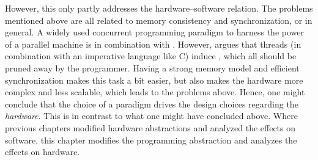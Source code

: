 However, this only partly addresses the hardware--software relation.
The problems mentioned above are all related to memory consistency and synchronization, or  in general.
A widely used concurrent programming paradigm to harness the power of a parallel machine is  in combination with .
However, \citet{lee:problem_with_threads} argues that threads (in combination with an imperative language like C) induce , which all should be pruned away by the programmer.
Having a strong memory model and efficient synchronization makes this task a bit easier, but also makes the hardware more complex and less scalable, which leads to the problems above.
Hence, one might conclude that the choice of a  paradigm drives the design choices regarding the \emph{hardware}.
This is in contrast to what one might have concluded above.
Where previous chapters modified hardware abstractions and analyzed the effects on software, this chapter modifies the programming abstraction and analyzes the effects on hardware.


